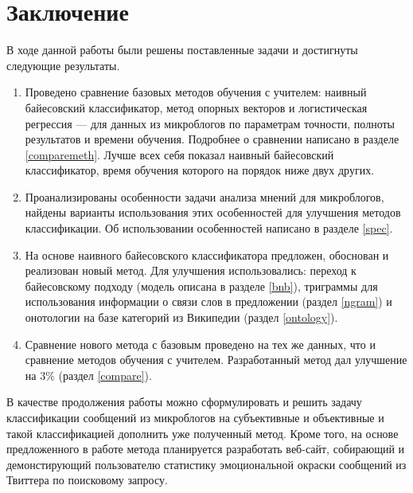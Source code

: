 \section*{Заключение}
В ходе данной работы были решены поставленные задачи и достигнуты следующие результаты.
\begin{enumerate}
\item Проведено сравнение базовых методов обучения с учителем: наивный байесовский классификатор,
  метод опорных векторов и логистическая регрессия --- для данных из микроблогов по
  параметрам точности, полноты результатов и времени обучения. Подробнее о сравнении написано в
  разделе \ref{comparemeth}. Лучше всех себя показал наивный байесовский классификатор, время
  обучения которого на порядок ниже двух других.
\item Проанализированы особенности задачи анализа мнений для микроблогов, найдены варианты
  использования этих особенностей для улучшения методов классификации. Об использовании особенностей
  написано в разделе \ref{spec}.
\item На основе наивного байесовского классификатора предложен, обоснован и реализован новый
  метод. Для улучшения использовались: переход к байесовскому подходу (модель описана в разделе
  \ref{bnb}), триграммы для использования информации о связи слов в предложении (раздел \ref{ngram})
  и онотологии на базе категорий из Википедии (раздел \ref{ontology}).
\item Сравнение нового метода с базовым проведено на тех же данных, что и сравнение методов обучения
  с учителем. Разработанный метод дал улучшение на $3\%$ (раздел \ref{compare}).
\end{enumerate}

В качестве продолжения работы можно сформулировать и решить задачу классификации сообщений
из микроблогов на субъективные и объективные и такой классификацией дополнить уже
полученный метод. Кроме того, на основе предложенного в работе метода планируется
разработать веб-сайт, собирающий и демонстирующий пользователю статистику эмоциональной окраски сообщений из Твиттера
по поисковому запросу.
